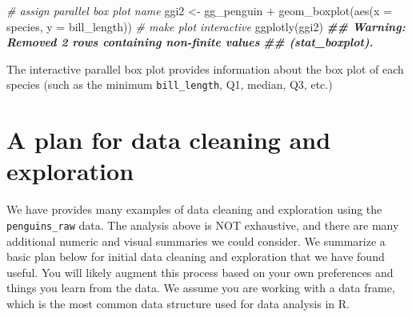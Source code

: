 \documentclass[
]{book}
\newenvironment{Shaded}{\begin{snugshade}}{\end{snugshade}}
\newcommand{\AttributeTok}[1]{\textcolor[rgb]{0.77,0.63,0.00}{#1}}
\newcommand{\CommentTok}[1]{\textcolor[rgb]{0.56,0.35,0.01}{\textit{#1}}}
\newcommand{\DocumentationTok}[1]{\textcolor[rgb]{0.56,0.35,0.01}{\textbf{\textit{#1}}}}
\newcommand{\FunctionTok}[1]{\textcolor[rgb]{0.00,0.00,0.00}{#1}}
\newcommand{\NormalTok}[1]{#1}
\newcommand{\OtherTok}[1]{\textcolor[rgb]{0.56,0.35,0.01}{#1}}
\newcommand{\SpecialCharTok}[1]{\textcolor[rgb]{0.00,0.00,0.00}{#1}}
\theoremstyle{definition}
\theoremstyle{definition}
\theoremstyle{definition}
\theoremstyle{definition}
\theoremstyle{remark}
\begin{document}
\begin{Shaded}
\begin{Highlighting}[]
\CommentTok{\# assign parallel box plot name}
\NormalTok{ggi2 }\OtherTok{\textless{}{-}}
\NormalTok{  gg\_penguin }\SpecialCharTok{+}
  \FunctionTok{geom\_boxplot}\NormalTok{(}\FunctionTok{aes}\NormalTok{(}\AttributeTok{x =}\NormalTok{ species, }\AttributeTok{y =}\NormalTok{ bill\_length))}
\CommentTok{\# make plot interactive}
\FunctionTok{ggplotly}\NormalTok{(ggi2)}
\DocumentationTok{\#\# Warning: Removed 2 rows containing non{-}finite values}
\DocumentationTok{\#\# (stat\_boxplot).}
\end{Highlighting}
\end{Shaded}

The interactive parallel box plot provides information about the box plot of each species (such as the minimum \texttt{bill\_length}, Q1, median, Q3, etc.)

\hypertarget{a-plan-for-data-cleaning-and-exploration}{%
\section{A plan for data cleaning and exploration}\label{a-plan-for-data-cleaning-and-exploration}}

We have provides many examples of data cleaning and exploration using the \texttt{penguins\_raw} data. The analysis above is NOT exhaustive, and there are many additional numeric and visual summaries we could consider. We summarize a basic plan below for initial data cleaning and exploration that we have found useful. You will likely augment this process based on your own preferences and things you learn from the data. We assume you are working with a data frame, which is the most common data structure used for data analysis in R.
\end{document}
